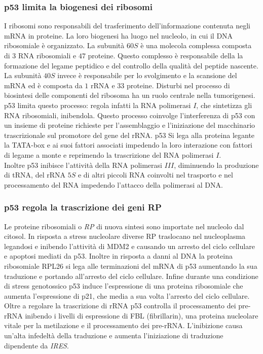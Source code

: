    \subsubsection{p53 limita la biogenesi dei ribosomi}
    I ribosomi sono responsabili del trasferimento dell'informazione contenuta negli mRNA in proteine.
    La loro biogenesi ha luogo nel nucleolo, in cui il DNA ribosomiale \`e organizzato.
    La subunit\`a $60S$ \`e una molecola complessa composta di $3$ RNA ribosomiali e $47$ proteine.
    Questo complesso \`e responsabile della la formazione del legame peptidico e del controllo della qualit\`a del peptide nascente.
    La subunit\`a $40S$ invece \`e responsabile per lo svolgimento e la scansione del mRNA ed \`e composta da $1$ rRNA e $33$ proteine.
    Disturbi nel processo di biosintesi delle componenti del ribosoma ha un ruolo centrale nella tumorigenesi.\\
    p53 limita questo processo: regola infatti la RNA polimerasi $I$, che sintetizza gli RNA ribosomiali, inibendola.
    Questo processo coinvolge l'interferenza di p53 con un insieme di proteine richieste per l'assemblaggio e l'iniziazione del macchinario trascrizionale sul promotore del gene del rRNA.
    p53 Si lega alla proteina legante la TATA-box e ai suoi fattori associati impedendo la loro interazione con fattori di legame a monte e reprimendo la trascrizione del RNA polimerasi $I$.\\
    Inoltre p53 inibisce l'attivit\`a della RNA polimerasi $III$, diminuendo la produzione di tRNA, del rRNA $5S$ e di altri piccoli RNA coinvolti nel trasporto e nel processamento del RNA impedendo l'attacco della polimerasi al DNA.

    \subsubsection{p53 regola la trascrizione dei geni RP}
    Le proteine ribosomiali o \emph{RP} di nuova sintesi sono importate nel nucleolo dal citosol.
    In risposta a stress nucleolare diverse RP traslocano nel nucleoplasma legandosi e inibendo l'attivit\`a di MDM2 e causando un arresto del ciclo cellulare e apoptosi mediati da p53.
    Inoltre in risposta a danni al DNA la proteina ribosomiale RPL26 si lega alle terminazioni del mRNA di p53 aumentando la sua traduzione e portando all'arresto del ciclo cellulare.
    Infine durante una condizione di stress genotossico p53 induce l'espressione di una proteina ribosomiale che aumenta l'espressione di p21, che media a sua volta l'arresto del ciclo cellulare.\\
    Oltre a regolare la trascrizione di rRNA p53 controlla il processamento dei pre-rRNA inibendo i livelli di espressione di FBL (fibrillarin), una proteina nucleolare vitale per la metilazione e il processamento dei pre-rRNA.
    L'inibizione causa un'alta infedelt\`a della traduzione e aumenta l'iniziazione di traduzione dipendente da \emph{IRES}.

